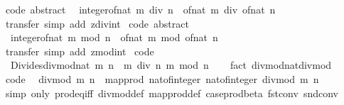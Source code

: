 \begin{isabellebody}
\ {\isacharbrackleft}code\ abstract{\isacharbrackright}{\isacharcolon}\isanewline
\ \ {\isachardoublequoteopen}integer{\isacharunderscore}of{\isacharunderscore}nat\ {\isacharparenleft}m\ div\ n{\isacharparenright}\ {\isacharequal}\ of{\isacharunderscore}nat\ m\ div\ of{\isacharunderscore}nat\ n{\isachardoublequoteclose}\isanewline
%
\isadelimproof
\ \ %
\endisadelimproof
%
\isatagproof
{}\isamarkupfalse%
\ transfer\ {\isacharparenleft}simp\ add{\isacharcolon}\ zdiv{\isacharunderscore}int{\isacharparenright}%
\endisatagproof
{\isafoldproof}%
%
\isadelimproof
\isanewline
%
\endisadelimproof
\isanewline
{}\isamarkupfalse%
\ {\isacharbrackleft}code\ abstract{\isacharbrackright}{\isacharcolon}\isanewline
\ \ {\isachardoublequoteopen}integer{\isacharunderscore}of{\isacharunderscore}nat\ {\isacharparenleft}m\ mod\ n{\isacharparenright}\ {\isacharequal}\ of{\isacharunderscore}nat\ m\ mod\ of{\isacharunderscore}nat\ n{\isachardoublequoteclose}\isanewline
%
\isadelimproof
\ \ %
\endisadelimproof
%
\isatagproof
{}\isamarkupfalse%
\ transfer\ {\isacharparenleft}simp\ add{\isacharcolon}\ zmod{\isacharunderscore}int{\isacharparenright}%
\endisatagproof
{\isafoldproof}%
%
\isadelimproof
\isanewline
%
\endisadelimproof
\isanewline
{}\isamarkupfalse%
\ {\isacharbrackleft}code{\isacharbrackright}{\isacharcolon}\isanewline
\ \ {\isachardoublequoteopen}Divides{\isachardot}divmod{\isacharunderscore}nat\ m\ n\ {\isacharequal}\ {\isacharparenleft}m\ div\ n{\isacharcomma}\ m\ mod\ n{\isacharparenright}{\isachardoublequoteclose}\isanewline
%
\isadelimproof
\ \ %
\endisadelimproof
%
\isatagproof
{}\isamarkupfalse%
\ {\isacharparenleft}fact\ divmod{\isacharunderscore}nat{\isacharunderscore}div{\isacharunderscore}mod{\isacharparenright}%
\endisatagproof
{\isafoldproof}%
%
\isadelimproof
\isanewline
%
\endisadelimproof
\isanewline
{}\isamarkupfalse%
\ {\isacharbrackleft}code{\isacharbrackright}{\isacharcolon}\isanewline
\ \ {\isachardoublequoteopen}divmod\ m\ n\ {\isacharequal}\ map{\isacharunderscore}prod\ nat{\isacharunderscore}of{\isacharunderscore}integer\ nat{\isacharunderscore}of{\isacharunderscore}integer\ {\isacharparenleft}divmod\ m\ n{\isacharparenright}{\isachardoublequoteclose}\isanewline
%
\isadelimproof
\ \ %
\endisadelimproof
%
\isatagproof
{}\isamarkupfalse%
\ {\isacharparenleft}simp\ only{\isacharcolon}\ prod{\isacharunderscore}eq{\isacharunderscore}iff\ divmod{\isacharunderscore}def\ map{\isacharunderscore}prod{\isacharunderscore}def\ case{\isacharunderscore}prod{\isacharunderscore}beta\ fst{\isacharunderscore}conv\ snd{\isacharunderscore}conv{\isacharparenright}\isanewline

\end{isabellebody}
